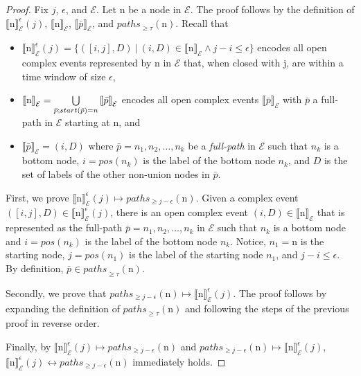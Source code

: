 \begin{proof}
  Fix $j$, $\epsilon$, and $\mathcal{E}$. Let \textrm{n} be a node in $\mathcal{E}$. The proof follows by the definition of ${\llbracket \text{n} \rrbracket}^{\epsilon}_{\mathcal{E}}(j)$, ${\llbracket \text{n} \rrbracket}_{\mathcal{E}}$, ${\llbracket \bar{p} \rrbracket}_{\mathcal{E}}$, and ${paths}_{\ge \tau}(\text{n})$. Recall that

  \begin{itemize}
    \item ${\llbracket \text{n} \rrbracket}^{\epsilon}_{\mathcal{E}}(j) = \{ ([i,j], D) \ | \ (i,D) \in {\llbracket \text{n} \rrbracket}_{\mathcal{E}} \land j - i \le \epsilon \}$ encodes all open complex events represented by \textrm{n} in $\mathcal{E}$ that, when closed with j, are within a time window of size $\epsilon$,
    \item ${\llbracket \text{n} \rrbracket}_{\mathcal{E}} = \bigcup\limits_{\bar{p};\\ start(\bar{p}) = n} {\llbracket \bar{p} \rrbracket}_{\mathcal{E}}$ encodes all open complex events ${\llbracket \bar{p} \rrbracket}_{\mathcal{E}}$ with $\bar{p}$ a full-path in $\mathcal{E}$ starting at \textrm{n}, and
    \item ${\llbracket \bar{p} \rrbracket}_{\mathcal{E}} = (i, D)$ where $\bar{p} = n_{1},n_{2}, \ldots, n_{k}$ be a \emph{full-path} in $\mathcal{E}$ such that $n_{k}$ is a bottom node, $i = pos(n_{k})$ is the label of the bottom node $n_{k}$, and $D$ is the set of labels of the other non-union nodes in $\bar{p}$.
  \end{itemize}

  First, we prove ${\llbracket \text{n} \rrbracket}^{\epsilon}_{\mathcal{E}}(j) \longmapsto paths_{\ge j - \epsilon}(\text{n})$. Given a complex event $([i, j], D) \in {\llbracket \text{n} \rrbracket}^{\epsilon}_{\mathcal{E}}(j)$, there is an open complex event $(i, D) \in {\llbracket \text{n} \rrbracket}_{\mathcal{E}}$ that is represented as the full-path $\bar{p} = n_{1},n_{2}, \ldots, n_{k}$ in $\mathcal{E}$ such that $n_{k}$ is a bottom node and $i = pos(n_{k})$ is the label of the bottom node $n_{k}$. Notice, $n_{1} = \textrm{n}$ is the starting node, $j = pos(n_{1})$ is the label of the starting node $n_{1}$, and $j - i \le \epsilon$. By definition, $\bar{p} \in {paths}_{\ge \tau}(\text{n})$.

  Secondly, we prove that $paths_{\ge j - \epsilon}(\text{n}) \longmapsto {\llbracket \text{n} \rrbracket}^{\epsilon}_{\mathcal{E}}(j)$. The proof follows by expanding the definition of ${paths}_{\ge \tau}(\text{n})$ and following the steps of the previous proof in reverse order.

  Finally, by ${\llbracket \text{n} \rrbracket}^{\epsilon}_{\mathcal{E}}(j) \longmapsto paths_{\ge j - \epsilon}(\text{n})$ and $paths_{\ge j - \epsilon}(\text{n}) \longmapsto {\llbracket \text{n} \rrbracket}^{\epsilon}_{\mathcal{E}}(j)$, ${\llbracket \text{n} \rrbracket}^{\epsilon}_{\mathcal{E}}(j) \longleftrightarrow paths_{\ge j - \epsilon}(\text{n})$ immediately holds.

\end{proof}

